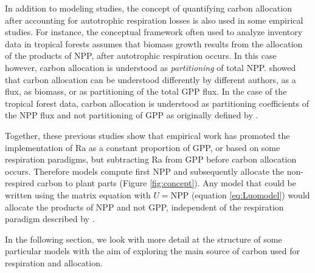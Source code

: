 \documentclass[bg, manuscript]{copernicus}
\begin{document}
In addition to modeling studies, the concept of quantifying carbon allocation after accounting for autotrophic respiration losses is also used in some empirical studies. For instance, the conceptual framework often used to analyze inventory data in tropical forests \citep[e.g.][]{Malhi2011, Malhi2015} assumes that biomass growth results from the allocation of the products of NPP, after autotrophic respiration occurs. In this case however, carbon allocation is understood as \emph{partitioning} of total NPP. \citet{Litton2007} showed that carbon allocation can be understood differently by different authors, as a flux, as biomass, or as partitioning of the total GPP flux. In the case of the tropical forest data, carbon allocation is understood as partitioning coefficients of the NPP flux and not partitioning of GPP as originally defined by \citet{Litton2007}.  

Together, these previous studies show that empirical work has promoted the implementation of Ra as a constant proportion of GPP, or based on some respiration paradigms, but subtracting Ra from GPP before carbon allocation occurs. Therefore models compute first NPP and subsequently allocate the non-respired carbon to plant parts (Figure \ref{fig:concept}). Any model that could be written using the matrix equation with $U = \mathrm{NPP}$ (equation \ref{eq:Luomodel}) would allocate the products of NPP and not GPP, independent of the respiration paradigm described by \citet{Amthor2000}. 

In the following section, we look with more detail at the structure of some particular models with the aim of exploring the main source of carbon used for respiration and allocation.
\end{document}
